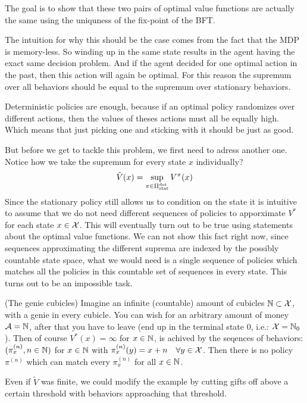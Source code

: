 The goal is to show that these two pairs of optimal value functions are actually the same using the uniquness of the fix-point of the BFT. 

The intuition for why this should be the case comes from the fact that the MDP is memory-less. So winding up in the same state results in the agent having the exact same decision problem. And if the agent decided for one optimal action in the past, then this action will again be optimal. For this reason the supremum over all behaviors should be equal to the supremum over stationary behaviors. 

Deterministic policies are enough, because if an optimal policy randomizes over different actions, then the values of theses actions must all be equally high. Which means that just picking one and sticking with it should be just as good.

But before we get to tackle this problem, we first need to adress another one. Notice how we take the supremum for every state \(x\) individually? 
\begin{equation*}
\tilde{V}(x)=\sup_{\pi\in\Pi_{\textnormal{stat}}^{\textnormal{det}}}V^\pi(x) 
\end{equation*}
Since the stationary policy still allows us to condition on the state it is intuitive to assume that we do not need different sequences of policies to apporximate \(V^*\) for each state \(x\in\mathcal{X}\). This will eventually turn out to be true using statements about the optimal value functions. We can not show this fact right now, since sequences approximating the different suprema are indexed by the possibly countable state space, what we would need is a single sequence of policies which matches all the policies in this countable set of sequences in every state. This turns out to be an impossible task.

\begin{example} (The genie cubicles)
Imagine an infinite (countable) amount of cubicles \(\mathbb{N} \subset \mathcal{X}\), with a genie in every cubicle. You can wish for an arbitrary amount of money \(\mathcal{A}=\mathbb{N}\), after that you have to leave (end up in the terminal state \(0\), i.e.: \(\mathcal{X}=\mathbb{N}_0\)). Then of course \(V^*(x)=\infty\) for \(x\in\mathbb{N}\), is achived by the seqences of behaviors: \((\pi_x^{(n)}, n\in\mathbb{N})\) for \(x\in\mathbb{N}\) with \(\pi_x^{(n)}(y)=x+n\quad \forall y\in\mathcal{X}\). Then there is no policy \(\pi^{(n)}\) which can match every \(\pi_x^{(n)}\) for all \(x\in\mathbb{N}\).

Even if \(\tilde{V}\) was finite, we could modify the example by cutting gifts off above a certain threshold with behaviors approaching that threshold. 
\end{example}

